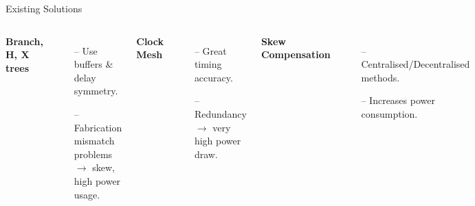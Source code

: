 \documentclass{beamer}
\begin{document}
\begin{frame}{Existing Solutions}
	\begin{columns}
		\textbf{Branch, H, X trees}
		\begin{itemize}
			\item[--]
				Use buffers \& delay symmetry.
			\item[--]
				Fabrication mismatch problems $\rightarrow$ skew, high power usage.
		\end{itemize}
		\textbf{Clock Mesh}
		\begin{itemize}
			\item[--]
				Great timing accuracy.
			\item[--]
				Redundancy $\rightarrow$ very high power draw.
		\end{itemize}
		\textbf{Skew Compensation}
        \begin{itemize}
        	\item[--]
        		Centralised/Decentralised methods.
	        \item[--]
	            Increases power consumption.
	    \end{itemize}
			\includegraphics[scale=0.4]{eldar_trees}
			\includegraphics[scale=0.4]{eldar_mesh}
            \begin{flushright}[Zianbetov, 2013]\end{flushright}
	\end{columns}
 
\end{frame}
\end{document}
